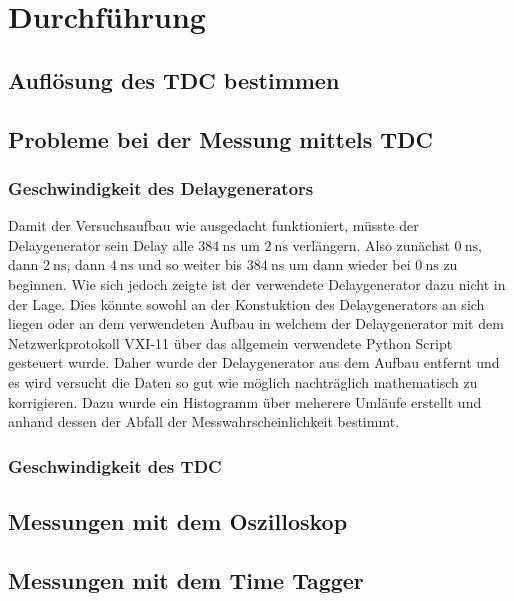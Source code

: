 \section{Durchführung}
\label{sec:Durchfuehrung}

\subsection{Auflösung des TDC bestimmen}
\label{sec:AufloesungTDC}

\subsection{Probleme bei der Messung mittels TDC}
\label{sec:ProblemeTDC}

\subsubsection{Geschwindigkeit des Delaygenerators}
\label{sec:Delaygenerator}
Damit der Versuchsaufbau wie ausgedacht funktioniert, müsste der Delaygenerator sein Delay alle 
$\SI{384}{\nano\second}$ um $\SI{2}{\nano\second}$ verlängern. Also zunächst $\SI{0}{\nano\second}$,
dann $\SI{2}{\nano\second}$, dann $\SI{4}{\nano\second}$ und so weiter bis $\SI{384}{\nano\second}$
um dann wieder bei $\SI{0}{\nano\second}$ zu beginnen. Wie sich jedoch zeigte ist der verwendete
Delaygenerator dazu nicht in der Lage. Dies könnte sowohl an der Konstuktion des Delaygenerators an sich 
liegen oder an dem verwendeten Aufbau in welchem der Delaygenerator mit dem Netzwerkprotokoll VXI-11
über das allgemein verwendete Python Script gesteuert wurde. Daher wurde der Delaygenerator aus dem 
Aufbau entfernt und es wird versucht die Daten so gut wie möglich nachträglich mathematisch zu korrigieren.
Dazu wurde ein Histogramm über meherere Umläufe erstellt und anhand dessen der Abfall der 
Messwahrscheinlichkeit bestimmt.

\subsubsection{Geschwindigkeit des TDC}
\label{sec:GeschwindigkeitTDC}


\subsection{Messungen mit dem Oszilloskop}
\label{sec:MessungenOszilloskop}

\subsection{Messungen mit dem Time Tagger}
\label{sec:MessungenTT}
